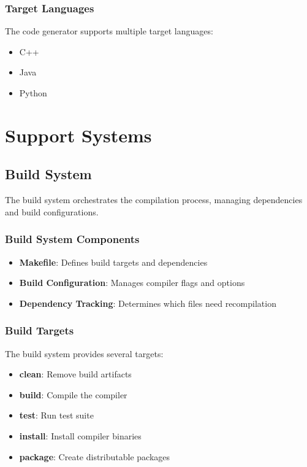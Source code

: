 \documentclass[12pt,a4paper]{article}
\begin{document}
\subsubsection{Target Languages}

The code generator supports multiple target languages:

\begin{itemize}
    \item C++
    \item Java
    \item Python
\end{itemize}

\section{Support Systems}

\subsection{Build System}

The build system orchestrates the compilation process, managing dependencies and build configurations.

\subsubsection{Build System Components}

\begin{itemize}
    \item \textbf{Makefile}: Defines build targets and dependencies
    \item \textbf{Build Configuration}: Manages compiler flags and options
    \item \textbf{Dependency Tracking}: Determines which files need recompilation
\end{itemize}

\subsubsection{Build Targets}

The build system provides several targets:

\begin{itemize}
    \item \textbf{clean}: Remove build artifacts
    \item \textbf{build}: Compile the compiler
    \item \textbf{test}: Run test suite
    \item \textbf{install}: Install compiler binaries
    \item \textbf{package}: Create distributable packages
\end{itemize}
\end{document}
